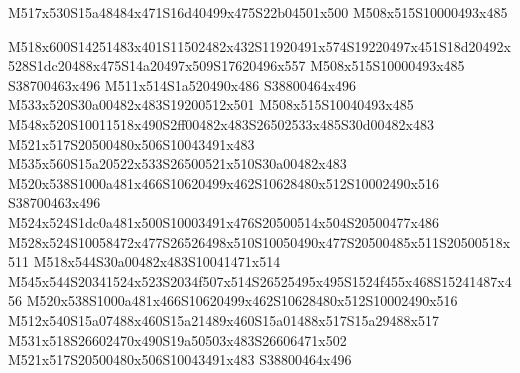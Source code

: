 \documentclass{article}
\begin{document}
\begin{multicols}{2}


\begin{center}
M517x530S15a48484x471S16d40499x475S22b04501x500 M508x515S10000493x485 
\end{center}








M518x600S14251483x401S11502482x432S11920491x574S19220497x451S18d20492x528S1dc20488x475S14a20497x509S17620496x557 M508x515S10000493x485 S38700463x496 M511x514S1a520490x486 S38800464x496 M533x520S30a00482x483S19200512x501 M508x515S10040493x485 M548x520S10011518x490S2ff00482x483S26502533x485S30d00482x483 M521x517S20500480x506S10043491x483 M535x560S15a20522x533S26500521x510S30a00482x483 M520x538S1000a481x466S10620499x462S10628480x512S10002490x516 S38700463x496 M524x524S1dc0a481x500S10003491x476S20500514x504S20500477x486 M528x524S10058472x477S26526498x510S10050490x477S20500485x511S20500518x511 M518x544S30a00482x483S10041471x514 M545x544S20341524x523S2034f507x514S26525495x495S1524f455x468S15241487x456 M520x538S1000a481x466S10620499x462S10628480x512S10002490x516 M512x540S15a07488x460S15a21489x460S15a01488x517S15a29488x517 M531x518S26602470x490S19a50503x483S26606471x502 M521x517S20500480x506S10043491x483 S38800464x496




\end{multicols}
\end{document}
